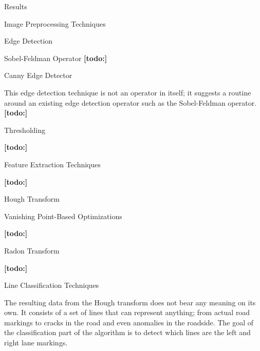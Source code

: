 \documentclass{matthijs}
\begin{document}
\begin{hoofdstuk}{Results}
\begin{paragraaf}{Image Preprocessing Techniques}
\begin{subparagraaf}{Edge Detection}
\begin{subsubparagraaf}{Sobel-Feldman Operator}
					\textbf{[todo:]}

				\end{subsubparagraaf}

				\begin{subsubparagraaf}{Canny Edge Detector}

					This edge detection technique is not an operator in itself; it suggests a routine around an existing edge detection operator such as the Sobel-Feldman operator.
					\textbf{[todo:]}

				\end{subsubparagraaf}

			\end{subparagraaf}

			\begin{subparagraaf}{Thresholding}

				\textbf{[todo:]}

			\end{subparagraaf}

		\end{paragraaf}

		\begin{paragraaf}{Feature Extraction Techniques}

			\textbf{[todo:]}

			\begin{subparagraaf}{Hough Transform}

				\begin{subsubparagraaf}{Vanishing Point-Based Optimizations}

					\textbf{[todo:]}

				\end{subsubparagraaf}

			\end{subparagraaf}

			\begin{subparagraaf}{Radon Transform}

				\textbf{[todo:]}

			\end{subparagraaf}
		\end{paragraaf}

		\begin{paragraaf}{Line Classification Techniques}

			The resulting data from the Hough transform does not bear any meaning on its own.
			It consists of a set of lines that can represent anything; from actual road markings to cracks in the road and even anomalies in the roadside.
			The goal of the classification part of the algorithm is to detect which lines are the left and right lane markings.


\end{paragraaf}
\end{hoofdstuk}
\end{document}
